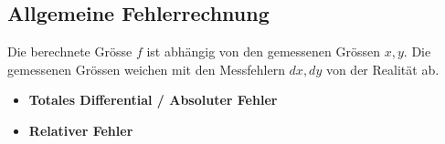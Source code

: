 \subsection{Allgemeine Fehlerrechnung}
    Die berechnete Grösse $f$ ist abhängig von den gemessenen Grössen $x,y$.
    Die gemessenen Grössen weichen mit den Messfehlern $dx,dy$ von der Realität ab.
    \begin{itemize}
        \item \textbf{Totales Differential / Absoluter Fehler}
        \item \textbf{Relativer Fehler}
    \end{itemize}